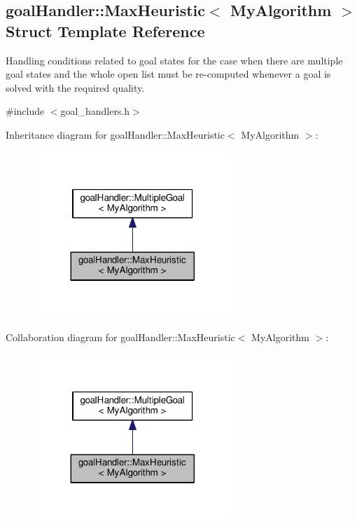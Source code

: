 \hypertarget{structgoalHandler_1_1MaxHeuristic}{}\subsection{goal\+Handler\+:\+:Max\+Heuristic$<$ My\+Algorithm $>$ Struct Template Reference}
\label{structgoalHandler_1_1MaxHeuristic}


Handling conditions related to goal states for the case when there are multiple goal states and the whole open list must be re-\/computed whenever a goal is solved with the required quality.  




{\ttfamily \#include $<$goal\+\_\+handlers.\+h$>$}



Inheritance diagram for goal\+Handler\+:\+:Max\+Heuristic$<$ My\+Algorithm $>$\+:\nopagebreak
\begin{figure}[H]
\begin{center}
\leavevmode
\includegraphics[width=212pt]{structgoalHandler_1_1MaxHeuristic__inherit__graph}
\end{center}
\end{figure}


Collaboration diagram for goal\+Handler\+:\+:Max\+Heuristic$<$ My\+Algorithm $>$\+:\nopagebreak
\begin{figure}[H]
\begin{center}
\leavevmode
\includegraphics[width=212pt]{structgoalHandler_1_1MaxHeuristic__coll__graph}
\end{center}
\end{figure}
